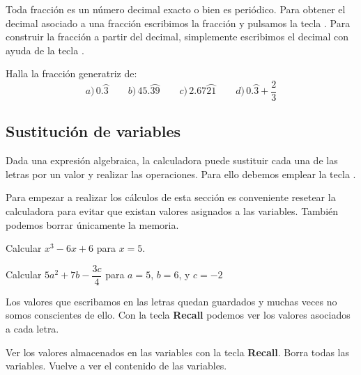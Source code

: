 \documentclass[12pt]{article}
\newcommand{\casiosymbol}[1]{{\footnotesize\casio\symbol{#1}}}
\newenvironment{capitulo}{\begin{tcolorbox}[colback=blue!5!white,colframe=red!75!black]}{\end{tcolorbox}\bigskip}
\newenvironment{ejer}{\begin{tcolorbox}[center title, 
fonttitle=\sffamily\bfseries,colback=blue!5,colframe=orange]}{\end{tcolorbox}}
\begin{document}
Toda fracción es un número decimal exacto o bien es periódico. Para obtener el decimal asociado a una fracción escribimos la fracción y pulsamos la tecla \casiosymbol{110}. Para construir la fracción a partir del decimal, simplemente escribimos el decimal con ayuda de la tecla \casiosymbol{58}.

\begin{ejer}

Halla la fracción generatriz de:
\[
a)\,0.\wideparen{3} \qquad b)\, 45.\wideparen{39} \qquad c)\, 2.67\wideparen{21}\qquad d)\, 0.\wideparen{3} + \frac{2}{3}
\]

\end{ejer}

\newpage

\begin{capitulo}
\section*{Sustitución de variables}
\end{capitulo}

Dada una expresión algebraica, la calculadora  puede sustituir cada una de las letras por un valor y realizar las operaciones. Para ello debemos emplear la tecla \casiosymbol{114}.

Para empezar a realizar los cálculos de esta sección es conveniente resetear la calculadora para evitar que existan valores asignados a las variables. También podemos borrar únicamente la memoria.

\begin{ejer}

Calcular $x^3-6x+6$ para $x=5$.

\end{ejer}

\begin{ejer}

Calcular $5a^2+7b-\dfrac{3c}{4}$ para $a=5$, $b=6$, y $c=-2$

\end{ejer}

Los valores que escribamos en las letras quedan guardados y muchas veces no somos conscientes de ello. Con la tecla \textbf{Recall} podemos ver los valores asociados a cada letra. 



\begin{ejer}

Ver los valores almacenados en las variables con la tecla \textbf{Recall}.  Borra todas las variables. Vuelve a ver el contenido de las variables.



\end{ejer}
\end{document}
